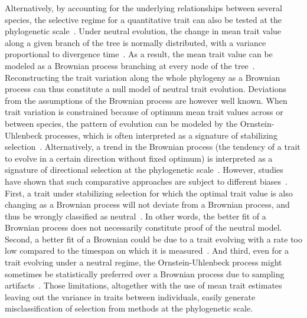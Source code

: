 \documentclass{article}
\begin{document}
Alternatively, by accounting for the underlying relationships between several species, the selective regime for a quantitative trait can also be tested at the phylogenetic scale~\citep{felsenstein_phylogenies_1985}.
Under neutral evolution, the change in mean trait value along a given branch of the tree is normally distributed, with a variance proportional to divergence time~\citep{felsenstein_phylogenies_1985, felsenstein_phylogenies_1988a, hansen_translating_1996}.
As a result, the mean trait value can be modeled as a Brownian process branching at every node of the tree~\citep{hansen_translating_1996, harmon_phylogenetic_2018}.
Reconstructing the trait variation along the whole phylogeny as a Brownian process can thus constitute a null model of neutral trait evolution.
Deviations from the assumptions of the Brownian process are however well known.
When trait variation is constrained because of optimum mean trait values across or between species, the pattern of evolution can be modeled by the Ornstein-Uhlenbeck processes, which is often interpreted as a signature of stabilizing selection~\citep{hansen_stabilizing_1997, catalan_drift_2019}.
Alternatively, a trend in the Brownian process (the tendency of a trait to evolve in a certain direction without fixed optimum) is interpreted as a signature of directional selection at the phylogenetic scale~\citep{silvestro_early_2019}.
However, studies have shown that such comparative approaches are subject to different biases~\citep{harmon_phylogenetic_2018}.
First, a trait under stabilizing selection for which the optimal trait value is also changing as a Brownian process will not deviate from a Brownian process, and thus be wrongly classified as neutral~\citep{hansen_translating_1996}.
In other words, the better fit of a Brownian process does not necessarily constitute proof of the neutral model.
Second, a better fit of a Brownian could be due to a trait evolving with a rate too low compared to the timespan on which it is measured~\citep{grabowski_cautionary_2023}.
And third, even for a trait evolving under a neutral regime, the Ornstein-Uhlenbeck process might sometimes be statistically preferred over a Brownian process due to sampling artifacts~\citep{silvestro_measurement_2015, cooper_cautionary_2016, price_detecting_2022}.
Those limitations, altogether with the use of mean trait estimates leaving out the variance in traits between individuals, easily generate misclassification of selection from methods at the phylogenetic scale.
\end{document}
